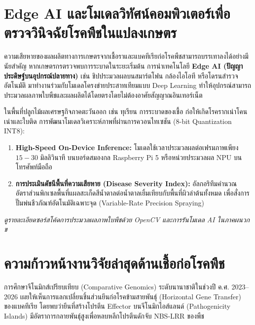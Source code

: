 \section{Edge AI และโมเดลวิทัศน์คอมพิวเตอร์เพื่อตรวจวินิจฉัยโรคพืชในแปลงเกษตร}

ความเสียหายของผลผลิตทางการเกษตรจากเชื้อราและแบคทีเรียก่อโรคพืชสามารถบรรเทาลงได้อย่างมีนัยสำคัญ หากเกษตรกรตรวจพบการระบาดในระยะเริ่มต้น การนำเทคโนโลยี \textbf{Edge AI (ปัญญาประดิษฐ์บนอุปกรณ์ปลายทาง)} เช่น ชิปประมวลผลบนสมาร์ตโฟน กล้องไอโอที หรือโดรนสำรวจอัตโนมัติ มาทำงานร่วมกับโมเดลโครงข่ายประสาทเทียมแบบ Deep Learning ทำให้อุปกรณ์สามารถประมวลผลภาพใบพืชและผลผลิตได้โดยตรงโดยไม่ต้องอาศัยสัญญาณอินเทอร์เน็ต \cite{chouhan2020deep, tsana2026edge}

\begin{application}
ในพื้นที่ปลูกไม้ผลเศรษฐกิจภาคตะวันออก เช่น ทุเรียน การระบาดของเชื้อ  ก่อให้เกิดโรครากเน่าโคนเน่าและใบติด การพัฒนาโมเดลวิเคราะห์ภาพที่ผ่านการควอนไทเซชัน (8-bit Quantization INT8):
\begin{enumerate}
    \item \textbf{High-Speed On-Device Inference:} โมเดลใช้เวลาประมวลผลต่อเฟรมภาพเพียง $15-30\text{ มิลลิวินาที}$ บนบอร์ดสมองกล Raspberry Pi 5 หรือหน่วยประมวลผล NPU บนโทรศัพท์มือถือ
    \item \textbf{การประเมินดัชนีพื้นที่ความเสียหาย (Disease Severity Index):} อัลกอริทึมคำนวณอัตราส่วนพิกเซลพื้นที่แผลสะเก็ดสีน้ำตาลต่อน้ำตาลเยิ้มเทียบกับพื้นที่ผิวลำต้นทั้งหมด เพื่อสั่งการปั๊มพ่นชีวภัณฑ์อัตโนมัติเฉพาะจุด (Variable-Rate Precision Spraying)
\end{enumerate}
\textit{ดูรายละเอียดซอร์สโค้ดการประมวลผลภาพใบพืชด้วย OpenCV และการรันโมเดล AI ในภาคผนวก ข}
\end{application}

\section{ความก้าวหน้างานวิจัยล่าสุดด้านเชื้อก่อโรคพืช}

การศึกษาจีโนมิกส์เปรียบเทียบ (Comparative Genomics) ระดับนานาชาติในช่วงปี ค.ศ. 2023–2026 เผยให้เห็นการแลกเปลี่ยนชิ้นส่วนยีนก่อโรคข้ามสายพันธุ์ (Horizontal Gene Transfer) ของแบคทีเรีย  \cite{pmid37176823} โดยพบว่ายีนที่สร้างโปรตีน Effector บนจีโนมิกไอส์แลนด์ (Pathogenicity Islands) มีอัตราการกลายพันธุ์สูงเพื่อหลบหลีกโปรตีนดักจับ NBS-LRR ของพืช 

